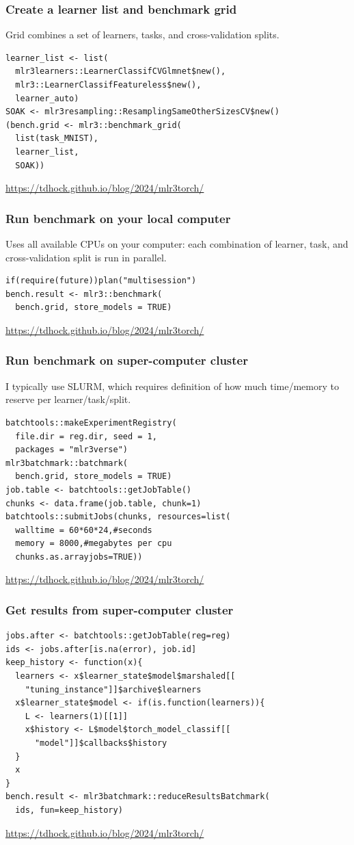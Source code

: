 \documentclass{beamer}
\begin{document}
\begin{frame}[fragile]
  \frametitle{Create a learner list and benchmark grid}
  Grid combines a set of learners, tasks, and cross-validation splits.
\begin{verbatim}
learner_list <- list(
  mlr3learners::LearnerClassifCVGlmnet$new(),
  mlr3::LearnerClassifFeatureless$new(),
  learner_auto)
SOAK <- mlr3resampling::ResamplingSameOtherSizesCV$new()
(bench.grid <- mlr3::benchmark_grid(
  list(task_MNIST),
  learner_list,
  SOAK))
\end{verbatim}
  \url{https://tdhock.github.io/blog/2024/mlr3torch/}
\end{frame}

\begin{frame}[fragile]
  \frametitle{Run benchmark on your local computer} Uses all available
  CPUs on your computer: each combination of learner, task, and
  cross-validation split is run in parallel.
\begin{verbatim}
if(require(future))plan("multisession")
bench.result <- mlr3::benchmark(
  bench.grid, store_models = TRUE)
\end{verbatim}
  \url{https://tdhock.github.io/blog/2024/mlr3torch/}
\end{frame}

\begin{frame}[fragile]
  \frametitle{Run benchmark on super-computer cluster} I typically use
  SLURM, which requires definition of how much time/memory to reserve
  per learner/task/split.
\begin{verbatim}
batchtools::makeExperimentRegistry(
  file.dir = reg.dir, seed = 1,
  packages = "mlr3verse")
mlr3batchmark::batchmark(
  bench.grid, store_models = TRUE)
job.table <- batchtools::getJobTable()
chunks <- data.frame(job.table, chunk=1)
batchtools::submitJobs(chunks, resources=list(
  walltime = 60*60*24,#seconds
  memory = 8000,#megabytes per cpu
  chunks.as.arrayjobs=TRUE))
\end{verbatim}
  \url{https://tdhock.github.io/blog/2024/mlr3torch/}
\end{frame}

\begin{frame}[fragile]
  \frametitle{Get results from super-computer cluster}
\begin{verbatim}
jobs.after <- batchtools::getJobTable(reg=reg)
ids <- jobs.after[is.na(error), job.id]
keep_history <- function(x){
  learners <- x$learner_state$model$marshaled[[
    "tuning_instance"]]$archive$learners
  x$learner_state$model <- if(is.function(learners)){
    L <- learners(1)[[1]]
    x$history <- L$model$torch_model_classif[[
      "model"]]$callbacks$history
  }
  x
}
bench.result <- mlr3batchmark::reduceResultsBatchmark(
  ids, fun=keep_history)
\end{verbatim}
  \url{https://tdhock.github.io/blog/2024/mlr3torch/}
\end{frame}
\end{document}
